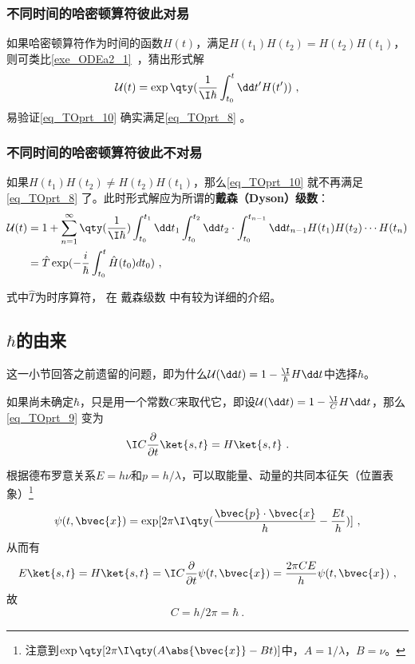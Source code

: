\subsubsection{不同时间的哈密顿算符彼此对易}

如果哈密顿算符作为时间的函数$H(t)$，满足$H(t_1)H(t_2)=H(t_2)H(t_1)$，则可类比\autoref{exe_ODEa2_1}~，猜出形式解
\begin{equation}\label{eq_TOprt_10}
\mathcal{U}(t)=\exp\qty(\frac{1}{\I\hbar}\int^t_{t_0}\dd t' H(t'))~,
\end{equation}
易验证\autoref{eq_TOprt_10} 确实满足\autoref{eq_TOprt_8} 。



\subsubsection{不同时间的哈密顿算符彼此不对易}

如果$H(t_1)H(t_2)\not=H(t_2)H(t_1)$，那么\autoref{eq_TOprt_10} 就不再满足\autoref{eq_TOprt_8} 了。此时形式解应为所谓的\textbf{戴森（Dyson）级数}：
\begin{align}
\mathcal{U}(t) &= 1+\sum_{n=1}^\infty \qty(\frac{1}{\I \hbar})\int^{t_1}_{t_0}\dd t_1\int^{t_2}_{t_0}\dd t_2\cdot \int^{t_{n-1}}_{t_0}\dd t_{n-1}H(t_1)H(t_2)\cdots H(t_n) \\
&=\hat T \exp(-\frac{i}{\hbar}\int^t_{t_0}\hat H(t_0)dt_0)~,
\end{align}

式中$\hat T$为时序算符，
在 戴森级数 中有较为详细的介绍。


\subsection{$\hbar$的由来}\label{sub_TOprt_1}

这一小节回答之前遗留的问题，即为什么$\mathcal{U}(\dd t) = 1-\frac{\I}{\hbar} H \dd t$中选择$\hbar$。

如果尚未确定$\hbar$，只是用一个常数$C$来取代它，即设$\mathcal{U}(\dd t) = 1-\frac{\I}{C} H \dd t$，那么\autoref{eq_TOprt_9} 变为
\begin{equation}
\I C\frac{\partial}{\partial t}\ket{s, t}=H\ket{s, t}~.
\end{equation}

根据德布罗意关系$E=h\nu$和$p=h/\lambda$，可以取能量、动量的共同本征矢（位置表象）\footnote{注意到$\exp\qty[2\pi \I \qty(A\abs{\bvec{x}}-Bt)]$中，$A=1/\lambda$，$B=\nu$。}
\begin{equation}
\psi(t, \bvec{x})=\exp[2\pi\I\qty(\frac{\bvec{p}\cdot\bvec{x}}{h}-\frac{Et}{h})]~,
\end{equation}
从而有
\begin{equation}
E\ket{s, t}=H\ket{s, t}=\I C\frac{\partial}{\partial t}\psi(t, \bvec{x}) = \frac{2\pi C E}{h} \psi(t, \bvec{x})~,
\end{equation}
故
\begin{equation}
C=h/2\pi=\hbar~.
\end{equation}








